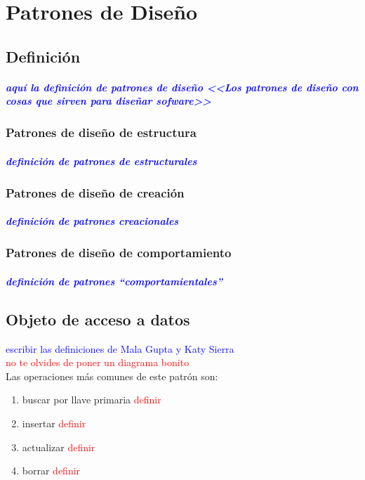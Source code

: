 \chapter{Patrones de Diseño}

\section{Definición}
\paragraph*{\textcolor{blue}{aquí la definición de patrones de diseño <<Los patrones de diseño con cosas que sirven para diseñar sofware>>}}
\subsection{Patrones de diseño de estructura}
\paragraph*{\textcolor{blue}{definición de patrones de estructurales}}
\subsection{Patrones de diseño de creación}
\paragraph*{\textcolor{blue}{definición de patrones creacionales}}
\subsection{Patrones de diseño de comportamiento}
\paragraph*{\textcolor{blue}{definición de patrones ``comportamientales''}}


\section{Objeto de acceso a datos}\label{sec-dao}
\textcolor{blue}{escribir las definiciones de Mala Gupta y Katy Sierra}\\
\textcolor{red}{no te olvides de poner un diagrama bonito}\\
Las operaciones más comunes de este patrón son:
\begin{enumerate}
	\item buscar por llave primaria \textcolor{red}{definir}
	\item insertar \textcolor{red}{definir}
	\item actualizar \textcolor{red}{definir}
	\item borrar \textcolor{red}{definir} 
\end{enumerate}


